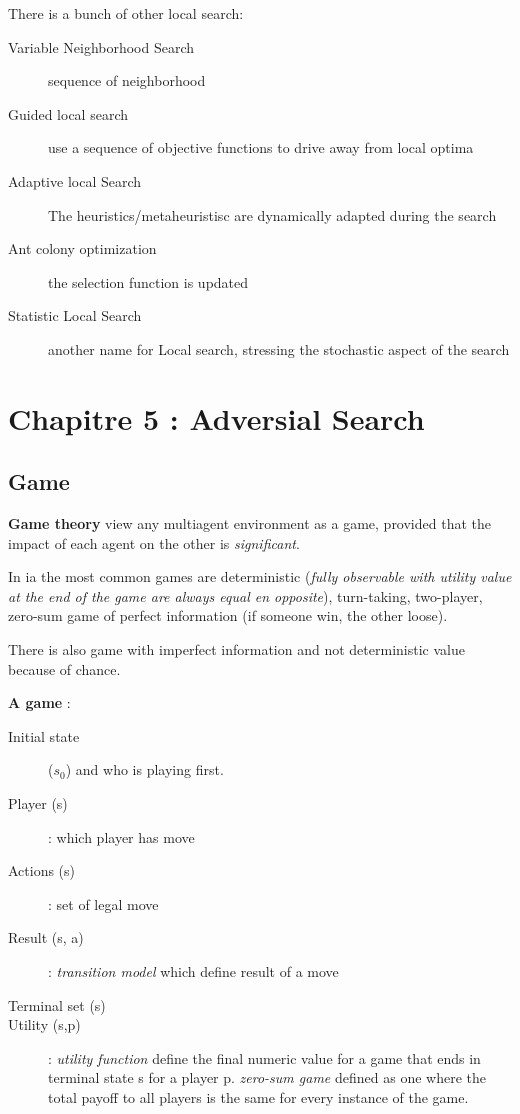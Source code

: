 There is a bunch of other local search:
\begin{description}
    \item[Variable Neighborhood Search] sequence of neighborhood
    \item[Guided local search] use a sequence of objective functions to drive away from local optima
    \item[Adaptive local Search] The heuristics/metaheuristisc are dynamically adapted during the search
    \item[Ant colony optimization] the selection function is updated
    \item[Statistic Local Search] another name for Local search, stressing the stochastic aspect of the search
\end{description}



\section{Chapitre 5 : Adversial Search}

\subsection{Game}

\textbf{Game theory} view any multiagent environment as a game, provided that
the impact of each agent on the other is \textit{significant}.

In ia the most common games are deterministic (\textit{fully observable with utility value at
the end of the game are always equal en opposite}), turn-taking, two-player, zero-sum game of
perfect information (if someone win, the other loose).

There is also game with imperfect information and not deterministic value because of chance.


\textbf{A game} :
\begin{description}
    \item[Initial state] ($s_0$) and who is playing first.
    \item[Player (s)] : which player has move
    \item[Actions (s)] : set of legal move
    \item[Result (s, a)] : \textit{transition model} which define result of a move
    \item[Terminal set (s)] 
    \item[Utility (s,p)] : \textit{utility function} define the final numeric value for a game that ends in terminal state s for a player p.
        \textit{zero-sum game} defined as one where the total payoff to all players is the same for every instance of the game.
\end{description}

